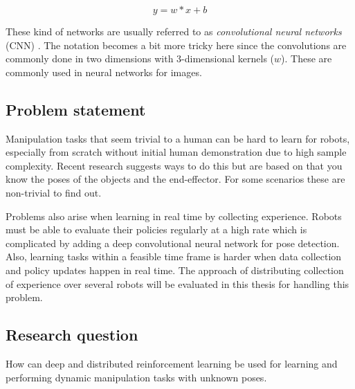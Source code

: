 \begin{equation}
    y = w * x + b
\end{equation}

These kind of networks are usually referred to as \textit{convolutional neural
networks} (CNN) \cite{lecun1989backpropagation}. The notation becomes a bit more tricky here since the
convolutions are commonly done in two dimensions with 3-dimensional kernels
($w$). These are commonly used in neural networks for images.

\subsection{Problem statement}

Manipulation tasks that seem trivial to a human can be hard to learn for
robots, especially from scratch without initial human demonstration due to high
sample complexity. Recent research suggests ways to do this but are based on
that you know the poses of the objects and the end-effector. For some scenarios
these are non-trivial to find out.

Problems also arise when learning in real time by collecting experience. Robots
must be able to evaluate their policies regularly at a high rate which is
complicated by adding a deep convolutional neural network for pose detection.
Also, learning tasks within a feasible time frame is harder when data
collection and policy updates happen in real time. The approach of
distributing collection of experience over several robots will be evaluated in
this thesis for handling this problem.

\subsection{Research question}

How can deep and distributed reinforcement learning be used for learning and
performing dynamic manipulation tasks with unknown poses.
